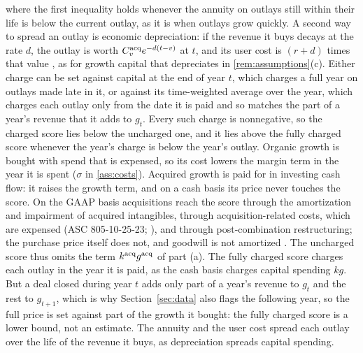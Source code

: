 \begin{remark}
where the first inequality holds whenever the annuity on outlays still within their life is below the current outlay, as it is when outlays grow quickly. A second way to spread an outlay is economic depreciation: if the revenue it buys decays at the rate $d$, the outlay is worth $C^{\rm acq}_ve^{-d(t-v)}$ at $t$, and its user cost is $(r+d)$ times that value \citep{hall1967tax}, as for growth capital that depreciates in \autoref{rem:assumptions}(c). Either charge can be set against capital at the end of year $t$, which charges a full year on outlays made late in it, or against its time-weighted average over the year, which charges each outlay only from the date it is paid and so matches the part of a year's revenue that it adds to $g_t$. Every such charge is nonnegative, so the charged score lies below the uncharged one, and it lies above the fully charged score whenever the year's charge is below the year's outlay. Organic growth is bought with spend that is expensed, so its cost lowers the margin term in the year it is spent ($\sigma$ in \autoref{ass:costs}). Acquired growth is paid for in investing cash flow: it raises the growth term, and on a cash basis its price never touches the score. On the GAAP basis acquisitions reach the score through the amortization and impairment of acquired intangibles, through acquisition-related costs, which are expensed (ASC 805-10-25-23; \citealp{deloitte2026acqcosts}), and through post-combination restructuring; the purchase price itself does not, and goodwill is not amortized \citep{fasb2026asc35020,ifrs2022goodwill}. The uncharged score thus omits the term $k^{\rm acq}g^{\rm acq}$ of part (a). The fully charged score charges each outlay in the year it is paid, as the cash basis charges capital spending $kg$. But a deal closed during year $t$ adds only part of a year's revenue to $g_t$ and the rest to $g_{t+1}$, which is why Section~\ref{sec:data} also flags the following year, so the full price is set against part of the growth it bought: the fully charged score is a lower bound, not an estimate. The annuity and the user cost spread each outlay over the life of the revenue it buys, as depreciation spreads capital spending.
\end{remark}

